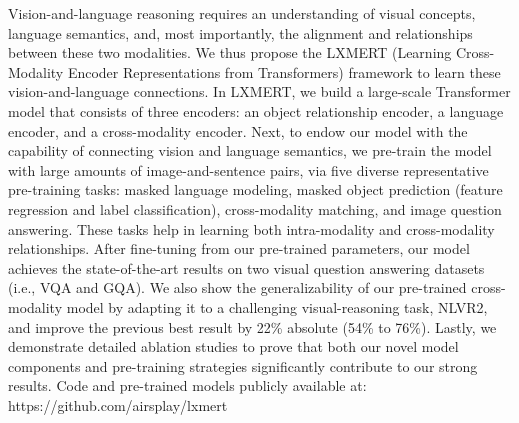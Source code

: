 Vision-and-language reasoning requires an understanding of visual concepts, language semantics, and, most importantly, the alignment and relationships between these two modalities. We thus propose the LXMERT (Learning Cross-Modality Encoder Representations from Transformers) framework to learn these vision-and-language connections. In LXMERT, we build a large-scale Transformer model that consists of three encoders: an object relationship encoder, a language encoder, and a cross-modality encoder. Next, to endow our model with the capability of connecting vision and language semantics, we pre-train the model with large amounts of image-and-sentence pairs, via five diverse representative pre-training tasks: masked language modeling, masked object prediction (feature regression and label classification), cross-modality matching, and image question answering. These tasks help in learning both intra-modality and cross-modality relationships. After fine-tuning from our pre-trained parameters, our model achieves the state-of-the-art results on two visual question answering datasets (i.e., VQA and GQA). We also show the generalizability of our pre-trained cross-modality model by adapting it to a challenging visual-reasoning task, NLVR2, and improve the previous best result by 22\% absolute (54\% to 76\%). Lastly, we demonstrate detailed ablation studies to prove that both our novel model components and pre-training strategies significantly contribute to our strong results. Code and pre-trained models publicly available at: https://github.com/airsplay/lxmert